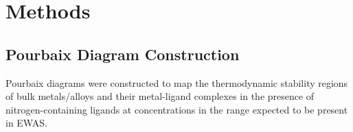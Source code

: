 \documentclass[journal=jacsat,manuscript=article]{achemso}
\begin{document}









\section{Methods}
\subsection{Pourbaix Diagram Construction}
Pourbaix diagrams were constructed to map the thermodynamic stability regions of bulk metals/alloys and their metal-ligand complexes in the presence of nitrogen-containing ligands at concentrations in the range expected to be present in EWAS.
\end{document}
